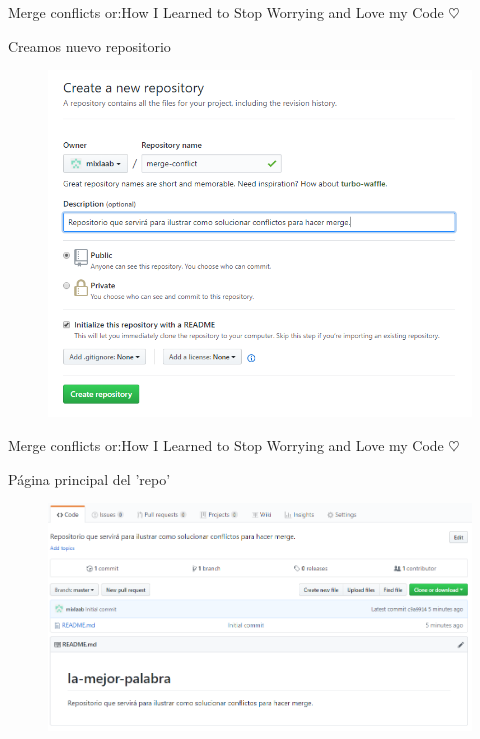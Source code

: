 \documentclass[10pt]{beamer}
\begin{document}
\begin{frame}{Merge conflicts or:}{How I Learned to Stop Worrying and Love my Code $\heartsuit$}

\begin{block}{Creamos nuevo repositorio}

\begin{figure}[h!]
\centering
\includegraphics [scale=0.4]{newrepo}
\label{fig:issues}
\end{figure}
    
\end{block}

\end{frame}

\begin{frame}{Merge conflicts or:}{How I Learned to Stop Worrying and Love my Code $\heartsuit$}

\begin{block}{Página principal del 'repo'}

\begin{figure}[h!]
\centering
\includegraphics [scale=0.35]{pagprinc}
\label{fig:issues}
\end{figure}
    
\end{block}

\end{frame}
\end{document}
